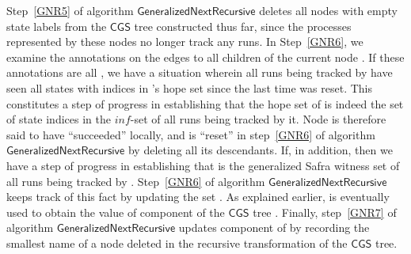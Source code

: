 \documentclass[3p]{elsarticle}
\newcommand{\infi}{\ensuremath{\mathit{inf}}}
\newcommand{\CGS}{\ensuremath{\textsf{CGS }}}
\newcommand{\algo}[1]{\ensuremath{\textsf{{#1}}}}
\begin{document}
Step~\ref{GNR5} of algorithm \algo{GeneralizedNextRecursive} deletes
all nodes with empty state labels from the \CGS tree constructed thus far,
since the processes represented by these nodes no longer track any
runs.  In Step~\ref{GNR6}, we examine the annotations on the edges to
all children of the current node .  If these annotations are all
, we have a situation wherein all runs being tracked by  have
seen all states with indices in 's hope set since the last time 
was reset.  This constitutes a step of progress in establishing that
the hope set of  is indeed the set of state indices in the
\infi-set of all runs being tracked by it.  Node  is therefore said
to have ``succeeded'' locally, and is ``reset'' in step~\ref{GNR6} of
algorithm \algo{GeneralizedNextRecursive} by deleting all its
descendants. If, in addition,  then we have a
step of progress in establishing that  is the generalized
Safra witness set of all runs being tracked by .  Step~\ref{GNR6}
of algorithm \algo{GeneralizedNextRecursive} keeps track of this fact
by updating the set .  As explained earlier,  is eventually used
to obtain the value of component  of the \CGS tree .  Finally,
step~\ref{GNR7} of algorithm \algo{GeneralizedNextRecursive} updates
component  of  by recording the smallest name of a node deleted
in the recursive transformation of the \CGS tree.
\end{document}
